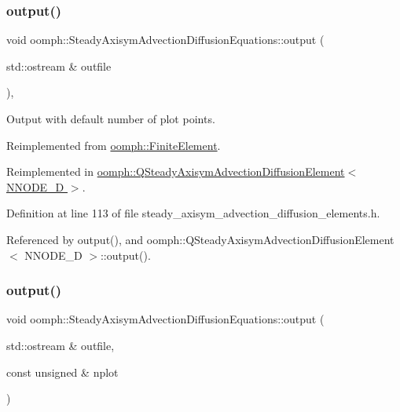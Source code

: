 \subsubsection{\texorpdfstring{output()}{output()}\hspace{0.1cm}{\footnotesize\ttfamily [1/4]}}
{\footnotesize\ttfamily void oomph\+::\+Steady\+Axisym\+Advection\+Diffusion\+Equations\+::output (\begin{DoxyParamCaption}\item[{std\+::ostream \&}]{outfile }\end{DoxyParamCaption})\hspace{0.3cm}{\ttfamily [inline]}, {\ttfamily [virtual]}}



Output with default number of plot points. 



Reimplemented from \hyperlink{classoomph_1_1FiniteElement_a2ad98a3d2ef4999f1bef62c0ff13f2a7}{oomph\+::\+Finite\+Element}.



Reimplemented in \hyperlink{classoomph_1_1QSteadyAxisymAdvectionDiffusionElement_acb9de208b63774c2ea96c1bcab916212}{oomph\+::\+Q\+Steady\+Axisym\+Advection\+Diffusion\+Element$<$ N\+N\+O\+D\+E\+\_\+D $>$}.



Definition at line 113 of file steady\+\_\+axisym\+\_\+advection\+\_\+diffusion\+\_\+elements.\+h.



Referenced by output(), and oomph\+::\+Q\+Steady\+Axisym\+Advection\+Diffusion\+Element$<$ N\+N\+O\+D\+E\+\_\+D $>$\+::output().

\mbox{\label{classoomph_1_1SteadyAxisymAdvectionDiffusionEquations_a8bfb52d77bb064940b0b82f9e347f323}} 
\subsubsection{\texorpdfstring{output()}{output()}\hspace{0.1cm}{\footnotesize\ttfamily [2/4]}}
{\footnotesize\ttfamily void oomph\+::\+Steady\+Axisym\+Advection\+Diffusion\+Equations\+::output (\begin{DoxyParamCaption}\item[{std\+::ostream \&}]{outfile,  }\item[{const unsigned \&}]{nplot }\end{DoxyParamCaption})\hspace{0.3cm}{\ttfamily [virtual]}}



